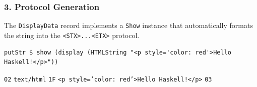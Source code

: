 \subsubsection{3. Protocol Generation}


The \texttt{DisplayData} record implements a \texttt{Show} instance that automatically formats the string into the \texttt{<STX>...<ETX>} protocol.
\begin{verbatim}
putStr $ show (display (HTMLString "<p style='color: red'>Hello Haskell!</p>"))
\end{verbatim}


\texttt{02} \texttt{text/html} \texttt{1F} \texttt{<p style='color: red'>Hello Haskell!</p>} \texttt{03}
